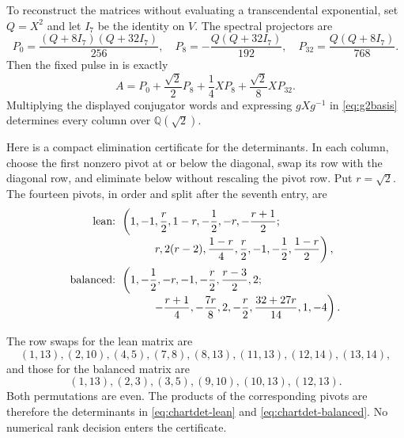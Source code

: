 \documentclass[11pt,a4paper]{article}
\begin{document}
To reconstruct the matrices without evaluating a transcendental exponential, set $Q=X^2$ and let $I_7$ be the identity on $V$.  The spectral projectors are
\[
P_0=\frac{(Q+8I_7)(Q+32I_7)}{256},\quad
P_8=-\frac{Q(Q+32I_7)}{192},\quad
P_{32}=\frac{Q(Q+8I_7)}{768}.
\]
Then the fixed pulse in  is exactly
\[
A=P_0+\frac{\sqrt2}{2}P_8+\frac14XP_8+\frac{\sqrt2}{8}XP_{32}.
\]
Multiplying the displayed conjugator words and expressing $gXg^{-1}$ in \eqref{eq:g2basis} determines every column over $\mathbb Q(\sqrt2)$.

\begin{samepage}
Here is a compact elimination certificate for the determinants.  In each column, choose the first nonzero pivot at or below the diagonal, swap its row with the diagonal row, and eliminate below without rescaling the pivot row.  Put $r=\sqrt2$.  The fourteen pivots, in order and split after the seventh entry, are
\begingroup{}
\begin{align*}
\text{lean: }&\left(1,-1,\frac r2,1-r,-\frac12,-r,-\frac{r+1}{2};\right.\\[-1mm]
&\hspace{10mm}\left.r,2(r-2),\frac{1-r}{4},\frac r2,-1,-\frac12,\frac{1-r}{2}\right),\\
\text{balanced: }&\left(1,-\frac12,-r,-1,-\frac r2,\frac{r-3}{2},2;\right.\\[-1mm]
&\hspace{10mm}\left.-\frac{r+1}{4},-\frac{7r}{8},2,-\frac r2,
\frac{32+27r}{14},1,-4\right).
\end{align*}
\endgroup
\end{samepage}
The row swaps for the lean matrix are
\[
(1,13),(2,10),(4,5),(7,8),(8,13),(11,13),(12,14),(13,14),
\]
and those for the balanced matrix are
\[
(1,13),(2,3),(3,5),(9,10),(10,13),(12,13).
\]
Both permutations are even.  The products of the corresponding pivots are therefore the determinants in \eqref{eq:chartdet-lean} and \eqref{eq:chartdet-balanced}.  No numerical rank decision enters the certificate.
\end{document}
